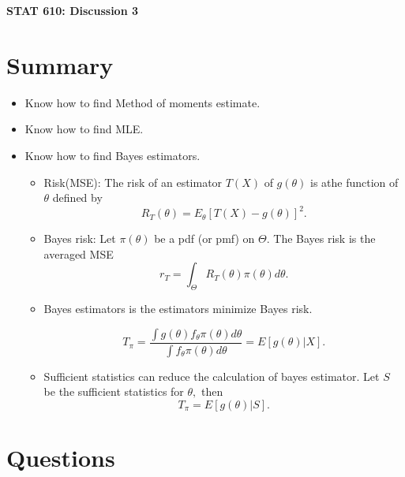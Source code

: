 \documentclass[12pt]{extarticle}
\begin{document}
\begin{center}
{\large \bf STAT 610: Discussion 3}
\end{center}
\vspace{0.22cm}

\section{Summary}
\begin{itemize}
	   \item Know how to find Method of moments estimate.
	   \item Know how to find MLE.
	   \item Know how to find Bayes estimators.
	   
	   \begin{itemize}
	   	\item Risk(MSE): The risk of an estimator $T(X)$ of $g(\theta)$ is athe function of $\theta$ defined by
	   $$R_T(\theta)=E_\theta[T(X)-g(\theta)]^2.$$
	   \item Bayes risk: Let $\pi(\theta)$ be a pdf (or pmf) on $\Theta$. The Bayes risk is the averaged MSE
	   $$r_T=\int_\Theta R_T(\theta)\pi(\theta)d \theta.$$
	   \item Bayes estimators is the estimators minimize Bayes risk.
	   
	   $$T_\pi=\frac{\int g(\theta)f_\theta \pi(\theta)d\theta}{\int f_\theta \pi(\theta)d\theta}=E[g(\theta)|X].$$
	   \item Sufficient statistics can reduce the calculation of bayes estimator. Let $S$ be the sufficient statistics for $\theta,$ then
	   $$T_\pi=E[g(\theta)|S].$$
	   \end{itemize}
	
\end{itemize}


\section{Questions}
\end{document}

